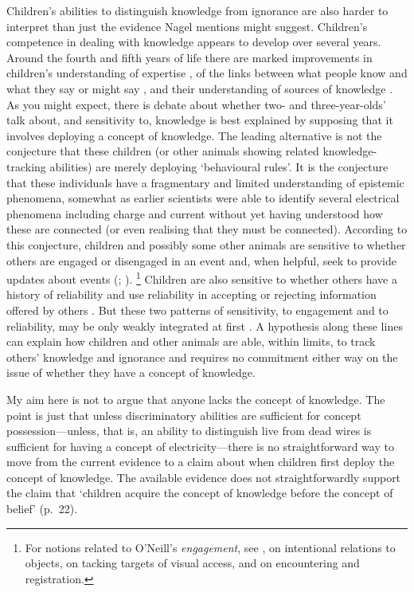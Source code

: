 \documentclass[11pt,a4paper]{extarticle}
\begin{document}
Children's abilities to distinguish knowledge from ignorance are also harder to interpret than just the evidence Nagel mentions might suggest.
Children's competence in dealing with knowledge appears to develop over several years.
Around the fourth and fifth years of life there are marked improvements in 
children's understanding of expertise 
\citep{lutz_early_2002,sobel_children_2010},
of the links between what people know and what they say or might say \citep{Robinson:1994nw,Robinson:2010uq},
and their understanding of sources of knowledge \citep{ONeill:1992ct,ONeill:2001co,Robinson:2006vl}.
As you might expect,
there is debate about whether two- and three-year-olds' talk about, and sensitivity to, knowledge is best explained by supposing that it involves deploying a concept of knowledge.
The leading alternative is not the conjecture that these children (or other animals showing related knowledge-tracking abilities) are merely deploying `behavioural rules'.
It is the conjecture that these individuals have a fragmentary and limited understanding of epistemic phenomena, somewhat as earlier scientists were able to identify several electrical phenomena including charge and current without yet having understood how these are connected (or even realising that they must be connected).
According to this conjecture, children and possibly some other animals are sensitive to whether others are engaged or disengaged in an event and, when helpful, seek to provide updates about events 
(\citealp[pp.\ 88-9]{ONeill:2005ff};
\citealp{viranyi_nonverbal_2005}).%
\footnote{
For notions related to O'Neill's \emph{engagement}, see 
\citet{Doherty:2006wz}, 
\citet{Gomez:2007fk} on intentional relations to objects, 
 \citet[p.\ 58]{Call:2005qe} on tacking targets of visual access,
and \citet{butterfill_minimal} on encountering and registration.
}
Children are also sensitive to whether others have a history of reliability and use reliability in accepting or rejecting information offered by others \citep{Koenig:2005rc,birch_three-_2008}.
But these two patterns of sensitivity, to engagement and to reliability, may be only weakly integrated at first \citep{nurmsoo_childrens_2009,nurmsoo_identifying_2009}.
A hypothesis along these lines can explain how children and other animals are able, within limits, to track others' knowledge and ignorance 
and requires no commitment either way on the issue of whether they have a concept of knowledge.

My aim here is not to argue that anyone lacks the concept of knowledge.
The point is just that unless discriminatory abilities are sufficient for  concept possession---unless, that is, an ability to distinguish live from dead wires is sufficient for having a concept of electricity---there is no straightforward way to move from the current evidence to a claim about when children first deploy the concept of knowledge.
The available evidence does not  straightforwardly support the claim that `children acquire the concept of knowledge before the concept of belief' (p.\ 22).
\end{document}
